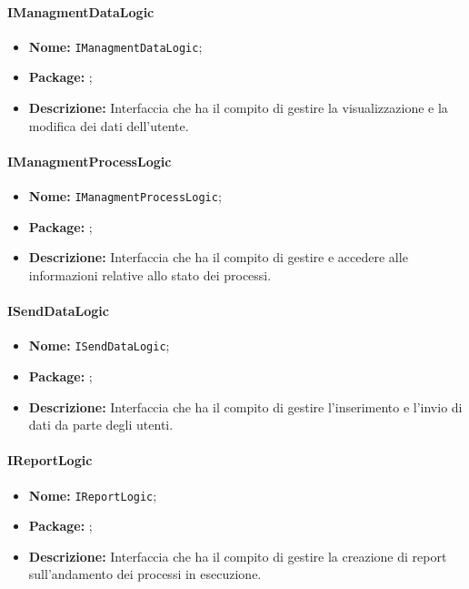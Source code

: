\paragraph{IManagmentDataLogic}
\begin{itemize}
\item \textbf{Nome:} \texttt{IManagmentDataLogic};
\item \textbf{Package:} \texttt{\iLogicUser{}};
\item \textbf{Descrizione:} Interfaccia che ha il compito di gestire la visualizzazione e la modifica dei dati dell'utente.
\end{itemize}

\paragraph{IManagmentProcessLogic}
\begin{itemize}
\item \textbf{Nome:} \texttt{IManagmentProcessLogic};
\item \textbf{Package:} \texttt{\iLogicUser{}};
\item \textbf{Descrizione:} Interfaccia che ha il compito di gestire e accedere alle informazioni relative allo stato dei processi.
\end{itemize}

\paragraph{ISendDataLogic}
\begin{itemize}
\item \textbf{Nome:} \texttt{ISendDataLogic};
\item \textbf{Package:} \texttt{\iLogicUser{}};
\item \textbf{Descrizione:} Interfaccia che ha il compito di gestire l'inserimento e l'invio di dati da parte degli utenti.
\end{itemize}

\paragraph{IReportLogic}
\begin{itemize}
\item \textbf{Nome:} \texttt{IReportLogic};
\item \textbf{Package:} \texttt{\iLogicUser{}};
\item \textbf{Descrizione:} Interfaccia che ha il compito di gestire la creazione di report sull'andamento dei processi in esecuzione.
\end{itemize}